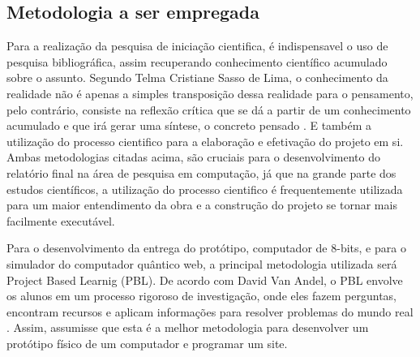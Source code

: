 \subsection{Metodologia a ser empregada}
Para a realização da pesquisa de iniciação cientifica, é indispensavel o uso de pesquisa bibliográfica, assim recuperando conhecimento científico acumulado sobre o assunto. Segundo Telma Cristiane Sasso de Lima, o conhecimento da realidade não é apenas a simples transposição dessa realidade para o pensamento, pelo contrário, consiste na reflexão crítica que se dá a partir de um conhecimento acumulado e que irá gerar uma síntese, o concreto pensado \cite{1}. E também a utilização do processo cientifico para a elaboração e efetivação do projeto em si. Ambas metodologias citadas acima, são cruciais para o desenvolvimento do relatório final na área de pesquisa em computação, já que na grande parte dos estudos científicos, a utilização do processo cientifico é frequentemente utilizada para um maior entendimento da obra e a construção do projeto se tornar mais facilmente executável.

Para o desenvolvimento da entrega do protótipo, computador de 8-bits, e para o simulador do computador quântico web, a principal metodologia utilizada será Project Based Learnig (PBL). De acordo com  David Van Andel, o PBL envolve os alunos em um processo rigoroso de investigação, onde eles fazem perguntas, encontram recursos e aplicam informações para resolver problemas do mundo real \cite{3}. Assim, assumisse que esta é a melhor metodologia para desenvolver um protótipo físico de um computador e programar um site.

\newpage